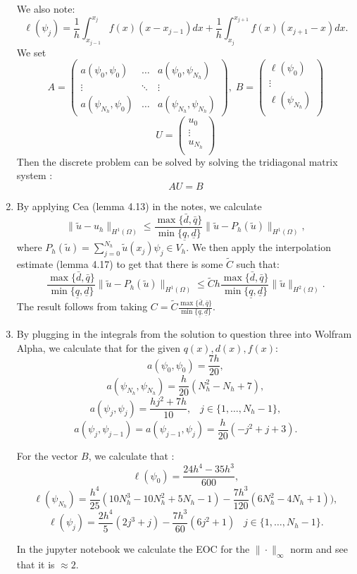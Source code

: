\documentclass[a4paper,11pt]{article}
\theoremstyle{plain} %
\theoremstyle{definition} %
\theoremstyle{remark} %
\newcommand{\qu}{\underline q}
\newcommand{\qo}{\bar{q}}
\newcommand{\du}{\underline d}
\newcommand{\dob}{\bar{d}}
\begin{document}
\begin{enumerate}
We also note:
\[\ell(\psi_j) = \frac 1 h \int_{x_{j-1}}^{x_j} f(x)(x-x_{j-1})dx +\frac 1 h \int_{x_{j}}^{x_{j+1}} f(x)(x_{j+1}-x)dx. \]
We set 
\[A =\begin{pmatrix}
a(\psi_0,\psi_0) & \hdots  & a(\psi_0,\psi_{N_h}) \\
\vdots & \ddots & \vdots \\
a(\psi_{N_h},\psi_0) & \hdots  & a(\psi_{N_h},\psi_{N_h}) 
\end{pmatrix}, \; 
B = \begin{pmatrix}
\ell(\psi_0) \\
\vdots \\
\ell(\psi_{N_h})\\
\end{pmatrix}
\] 
\[U = 
\begin{pmatrix}
u_{0}\\
\vdots \\
u_{N_h} \\
\end{pmatrix} \]
Then the discrete problem can be solved by solving the tridiagonal matrix system :
\[AU = B \]
\item By applying Cea (lemma 4.13) in the notes, we calculate 
\[ \| \tilde u - u_h \|_{H^1(\Omega)} \leq \frac{\max \{\dob, \qo\} }{\min \{\qu, \du \}} \| \tilde u - P_h(\tilde u)  \|_{H^1(\Omega)}, \]
where $P_h(\tilde u) = \sum^{N_h}_{j=0} \tilde u (x_j)\psi_j \in V_h$.
We then apply the interpolation estimate (lemma 4.17) to get that there is some $\tilde C$ such that:
\[\frac{\max \{\dob, \qo\} }{\min \{\qu, \du \}} \| \tilde u - P_h(\tilde u)  \|_{H^1(\Omega)}  \leq \tilde C h \frac{\max \{\dob, \qo\} }{\min \{\qu, \du \}} \| \tilde u  \|_{H^2(\Omega)}.  \]
The result follows from taking $C = \tilde C  \frac{\max \{\dob, \qo\} }{\min \{\qu, \du \}}$.
\item By plugging in the integrals from the solution to question three into Wolfram Alpha, we calculate that for the given $q(x),d(x),f(x)$:
\[a(\psi_0,\psi_0) =  \frac{7h}{20},\]
\[a(\psi_{N_h},\psi_{N_h}) = \frac{h}{20}(N_h^2-N_h+7),\]
\[a(\psi_j,\psi_j) = \frac{hj^2+7h}{10}, \; \; \; j \in \{1, \dotsc, N_h-1\},  \]
\[a(\psi_j,\psi_{j-1}) = a(\psi_{j-1},\psi_{j}) =  \frac{h}{20}(-j^2+j+3).\]

For the vector $B$, we calculate that :
\[\ell(\psi_0) =  \frac{24h^4-35h^3}{600}, \]
\[\ell(\psi_{N_h}) =  \frac{h^4}{25}(10N_h^3 - 10 N_h^2+5N_h -1) - \frac{7h^3}{120}(6N_h^2-4N_h+1)),\]
\[\ell(\psi_j) =  \frac{2h^4}{5}(2j^3+j)-\frac{7h^3}{60}(6j^2+1)  \; \; \; j \in \{1, \dotsc, N_h-1\}.\]

In the jupyter notebook we calculate the EOC for the $\| \cdot \|_\infty$ norm and see that it is $\approx 2$.
\end{enumerate}
\end{document}
